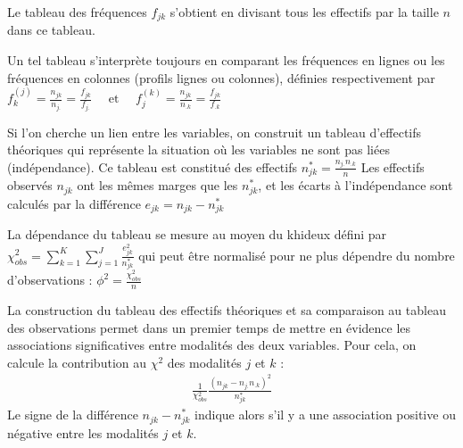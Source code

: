 \documentclass[letterpaper,10pt,english]{jupyterBook}
\begin{document}
\sphinxAtStartPar
Le tableau des fréquences \(f_{jk}\) s’obtient en divisant tous les effectifs par la taille \(n\) dans ce tableau.

\sphinxAtStartPar
Un tel tableau s’interprète toujours en comparant les fréquences en lignes ou les fréquences en colonnes (profils lignes ou colonnes), définies  respectivement par
\(f_k^{(j)}= \frac{n_{jk}}{n_{j.}}=\frac{f_{jk}}{f_{j.}}\quad\textrm{ et }\quad f_j^{(k)}= \frac{n_{jk}}{n_{.k}}=\frac{f_{jk}}{f_{.k}}\)

\sphinxAtStartPar
Si l’on cherche un lien entre les variables, on construit un tableau d’effectifs théoriques qui représente la situation où les variables ne sont pas liées (indépendance). Ce tableau est constitué des effectifs
\(n_{jk}^*=\frac{n_{j.}n_{.k}}{n}\)
Les effectifs observés \(n_{jk}\) ont les mêmes marges que les \(n_{jk}^*\), et les écarts à l’indépendance sont calculés par la différence \(e_{jk}=n_{jk}-n_{jk}^*\)

\ignorespaces 
\sphinxAtStartPar
La dépendance du tableau se mesure au moyen du khi\sphinxhyphen{}deux défini par
\(\chi^2_{obs}= \displaystyle\sum_{k=1}^K\displaystyle\sum_{j=1}^J\frac{e_{jk}^2}{n_{jk}^*}\)
qui peut être normalisé pour ne plus dépendre du nombre d’observations :
\(\phi^2=\frac{\chi^2_{obs}}{n}\)

\sphinxAtStartPar
La construction du tableau des effectifs théoriques et sa comparaison au tableau des observations permet dans un premier temps de mettre en évidence les associations significatives entre modalités des deux variables. Pour cela, on calcule la contribution au \(\chi^2\) des modalités \(j\) et \(k\) :
\begin{equation*}
\begin{split}\frac{1}{\chi^2_{obs}}\frac{\left (n_{jk}-n_{j.}n_{.k}\right )^2}{n_{jk}^*}\end{split}
\end{equation*}
\sphinxAtStartPar
Le signe de la différence \(n_{jk}-n_{jk}^*\) indique alors s’il y a une association positive ou négative entre les modalités \(j\) et \(k\).
\end{document}
